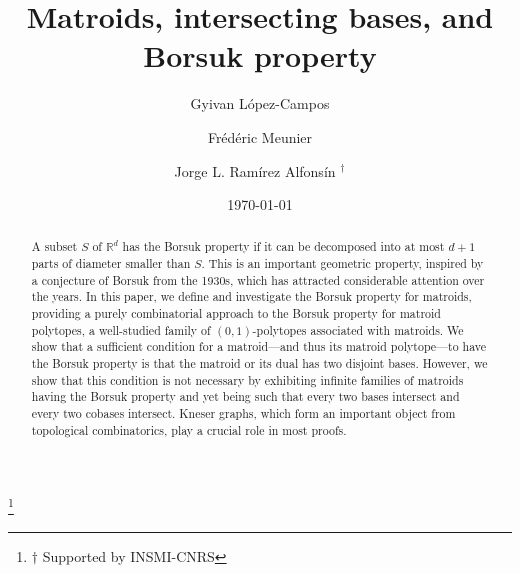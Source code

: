 \documentclass[12pt]{amsart}
\theoremstyle{plain}
\theoremstyle{definition}
\theoremstyle{remark}
\newcommand{\R}{\mathbb{R}}
\begin{document}

\title{Matroids, intersecting bases, and Borsuk property}

\thanks{$\dagger$ Supported by  INSMI-CNRS}

\date{\today}

\author[G. L\'opez-Campos]{Gyivan L\'opez-Campos}
\address[Gyivan L\'opez-Campos]{Universidad Nacional Autonoma de M\'exico, Instituto de Matem\'aticas, Unidad Juriquilla and
IMAG, Univ. Montpellier, CNRS, Montpellier, France}

\author[F. Meunier]{Fr\'ed\'eric Meunier}
\address[Frédéric Meunier]{CERMICS, ENPC, Institut Polytechnique de Paris, Marne-la-Vallée, France}

\author[J.L. Ram\'{i}rez Alfons\'{i}n]{Jorge L. Ram\'{i}rez Alfons\'{i}n $^\dagger$}
\address[Jorge L. Ram\'{i}rez Alfons\'{i}n]{IMAG, Univ. Montpellier, CNRS, Montpellier, France}


\begin{abstract} A subset $S$ of $\R^d$ has the Borsuk property if it can be decomposed into at most $d+1$ parts of diameter smaller than $S$. This is an important geometric property, inspired by a conjecture of Borsuk from the 1930s, which has attracted considerable attention over the years. In this paper, we define and investigate the Borsuk property for matroids, providing a purely combinatorial approach to the Borsuk property for matroid polytopes, a well-studied family of $(0,1)$-polytopes associated with matroids. We show that a sufficient condition for a matroid---and thus its matroid polytope---to have the Borsuk property is that the matroid or its dual has two disjoint bases. However, we show that this condition is not necessary by exhibiting infinite families of matroids having the Borsuk property and yet being such that every two bases intersect and every two cobases intersect. Kneser graphs, which form an important object from topological combinatorics, play a crucial role in most proofs.
\end{abstract}

\maketitle
\end{document}
